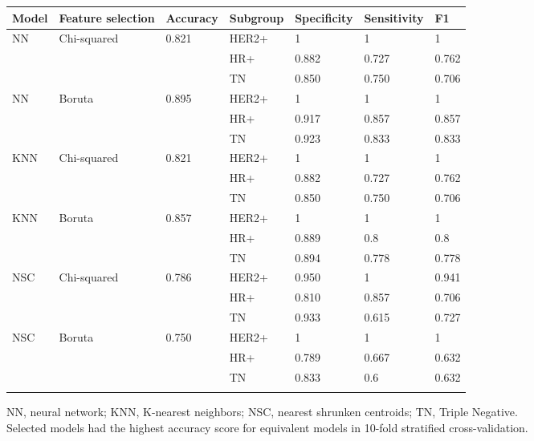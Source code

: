     \begin{table}[!t]
         {\begin{tabular}{@{}lllllll@{}}
        \toprule Model & Feature selection & Accuracy & Subgroup & Specificity & Sensitivity & F1 \\
        \midrule
        NN & Chi-squared  & 0.821  & HER2+ & 1     & 1     & 1\\
           &              &       & HR+   & 0.882 & 0.727 & 0.762\\
           &              &       & TN    & 0.850 & 0.750 & 0.706\\
        NN & Boruta       & 0.895 & HER2+ & 1     & 1     & 1\\
           &              &       & HR+   & 0.917 & 0.857 & 0.857\\
           &              &       & TN    & 0.923 & 0.833 & 0.833\\
        KNN & Chi-squared & 0.821 & HER2+ & 1     & 1     & 1\\
           &              &       & HR+   & 0.882 & 0.727 & 0.762\\
           &              &       & TN    & 0.850 & 0.750 & 0.706\\
        KNN & Boruta      & 0.857 & HER2+ & 1     & 1     & 1\\
           &              &       & HR+   & 0.889 & 0.8   & 0.8\\
           &              &       & TN    & 0.894 & 0.778 & 0.778\\
        NSC & Chi-squared & 0.786 & HER2+ & 0.950 & 1     & 0.941\\
           &              &       & HR+   & 0.810 & 0.857 & 0.706\\
           &              &       & TN    & 0.933 & 0.615 & 0.727\\
        NSC & Boruta      & 0.750 & HER2+ & 1     & 1     & 1\\
           &              &       & HR+   & 0.789 & 0.667 & 0.632\\
           &              &       & TN    & 0.833 & 0.6   & 0.632\\
        \botrule
        \end{tabular}}{NN, neural network; KNN, K-nearest neighbors; NSC, nearest shrunken centroids; TN, Triple Negative. \\ Selected models had the highest accuracy score for equivalent models in 10-fold stratified cross-validation.}
    \end{table}

